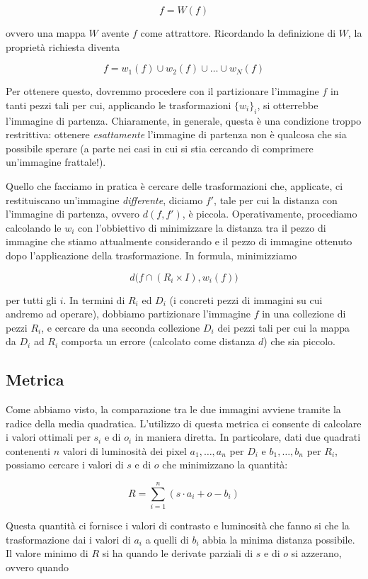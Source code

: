 \documentclass[11pt,a4paper,appendixprefix=true,numbers=noenddot]{scrreprt}
\begin{document}
\[
f = W(f)
\]

ovvero una mappa $W$ avente $f$ come attrattore. Ricordando la definizione di $W$, la proprietà richiesta diventa

\[
f = w_1(f) \cup w_2(f) \cup \dots \cup w_N(f)
\]

Per ottenere questo, dovremmo procedere con il partizionare l'immagine $f$ in tanti pezzi tali per cui, applicando le trasformazioni $\{w_i\}_i$, si otterrebbe l'immagine di partenza. Chiaramente, in generale, questa è una condizione troppo restrittiva: ottenere \emph{esattamente} l'immagine di partenza non è qualcosa che sia possibile sperare (a parte nei casi in cui si stia cercando di comprimere un'immagine frattale!).

Quello che facciamo in pratica è cercare delle trasformazioni che, applicate, ci restituiscano un'immagine \emph{differente}, diciamo $f'$, tale per cui la distanza con l'immagine di partenza, ovvero $d(f,f')$, è piccola. Operativamente, procediamo calcolando le $w_i$ con l'obbiettivo di minimizzare la distanza tra il pezzo di immagine che stiamo attualmente considerando e il pezzo di immagine ottenuto dopo l'applicazione della trasformazione. In formula, minimizziamo

\[
d\big(f \cap (R_i \times I), w_i(f)\big) 
\]

per tutti gli $i$. In termini di $R_i$ ed $D_i$ (i concreti pezzi di immagini su cui andremo ad operare), dobbiamo partizionare l'immagine $f$ in una collezione di pezzi $R_i$, e cercare da una seconda collezione $D_i$ dei pezzi tali per cui la mappa da $D_i$ ad $R_i$ comporta un errore (calcolato come distanza $d$) che sia piccolo.

\subsection*{Metrica}

Come abbiamo visto, la comparazione tra le due immagini avviene tramite la radice della media quadratica. L'utilizzo di questa metrica ci consente di calcolare i valori ottimali per $s_i$ e di $o_i$ in maniera diretta. In particolare, dati due quadrati contenenti $n$ valori di luminosità dei pixel $a_1, \dots, a_n$ per $D_i$ e $b_1, \dots, b_n$ per $R_i$, possiamo cercare i valori di $s$ e di $o$ che minimizzano la quantità:

\[
R = \sum_{i=1}^{n}{\left( s \cdot a_i + o - b_i \right) }
\]

Questa quantità ci fornisce i valori di contrasto e luminosità che fanno si che la trasformazione dai i valori di $a_i$  a quelli di $b_i$ abbia la minima distanza possibile. Il valore minimo di $R$ si ha quando le derivate parziali di $s$ e di $o$ si azzerano, ovvero quando
\end{document}

